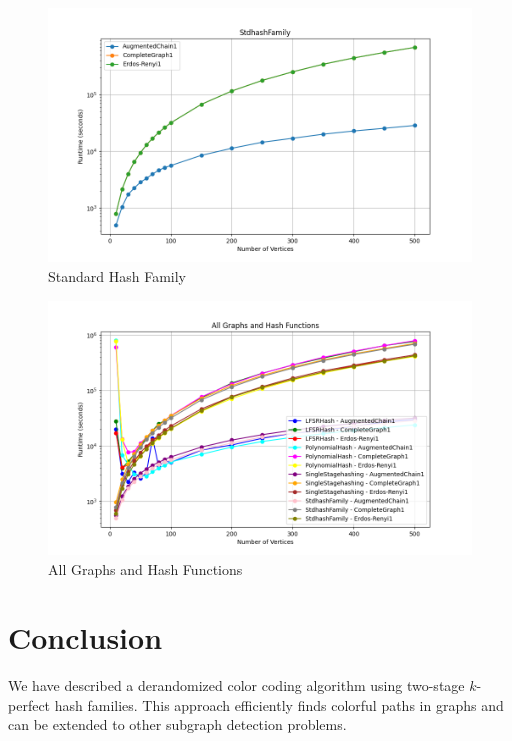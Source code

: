 \documentclass{article}
\begin{document}
\begin{figure}[H]
    \centering
    \includegraphics[width=0.8\linewidth]{figures/StdhashFamily(fixedK).png}
    \caption{Standard Hash Family}
    \label{fig:StdhashFamily}
\end{figure}

\begin{figure}[H]
    \centering
    \includegraphics[width=0.8\linewidth]{figures/AllGraphsAndHashFunctions(fixedK).png}
    \caption{All Graphs and Hash Functions}
    \label{fig:AllGraphsAndHashFunctions}
\end{figure}







\section{Conclusion}
We have described a derandomized color coding algorithm using two-stage $k$-perfect hash families. This approach efficiently finds colorful paths in graphs and can be extended to other subgraph detection problems.



\end{document}
